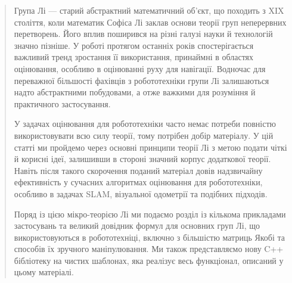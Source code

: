 
\begin{abstract}

Група Лі — старий абстрактний математичний об'єкт, що походить з XIX століття, коли математик Софіса Лі заклав основи теорії груп неперервних перетворень. 
Його вплив поширився на різні галузі науки й технологій значно пізніше.
У роботі протягом останніх років спостерігається важливий тренд зростання її використання, принаймні в областях оцінювання, особливо в оцінюванні руху для навігації.
Водночас для переважної більшості фахівців з робототехніки групи Лі залишаються надто абстрактними побудовами, а отже важкими для розуміння й практичного застосування.

У задачах оцінювання для робототехніки часто немає потреби повністю використовувати всю силу теорії, тому потрібен добір матеріалу.
У цій статті ми пройдемо через основні принципи теорії Лі з метою подати чіткі й корисні ідеї, залишивши в стороні значний корпус додаткової теорії.
Навіть після такого скорочення поданий матеріал довів надзвичайну ефективність у сучасних алгоритмах оцінювання для робототехніки, особливо в задачах SLAM, візуальної одометрії та подібних підходів.

Поряд із цією мікро-теорією Лі ми подаємо розділ із кількома прикладами застосувань та великий довідник формул для основних груп Лі, що використовуються в робототехніці, включно з більшістю матриць Якобі та способів їх зручного маніпулювання.
Ми також представляємо нову C++ бібліотеку на чистих шаблонах, яка реалізує весь функціонал, описаний у цьому матеріалі.


\end{abstract}


